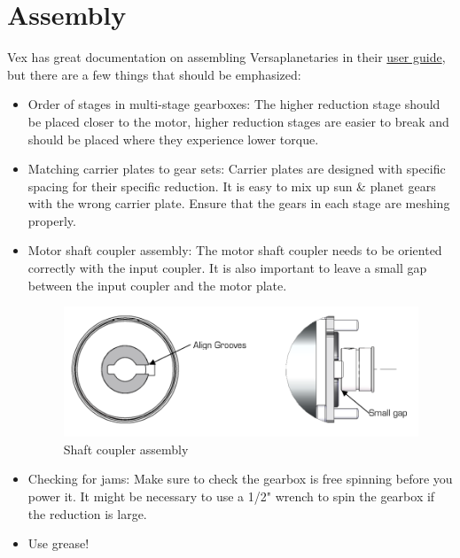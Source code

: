 \documentclass[12pt, letterpaper]{article}
\begin{document}
\section{Assembly}
Vex has great documentation on assembling Versaplanetaries in their \href{https://content.vexrobotics.com/vexpro/pdf/VersaPlanetary-v2-UserGuide-20170403.pdf}{user guide}, but there are a  few things that should be emphasized:
\begin{itemize}
    \item Order of stages in multi-stage gearboxes:
    \newline The higher reduction stage should be placed closer to the motor, higher reduction stages are easier to break and should be placed where they experience lower torque.
    
    \item  Matching carrier plates to gear sets:
    \newline Carrier plates are designed with specific spacing for their specific reduction. It is easy to mix up sun \& planet gears with the wrong carrier plate. Ensure that the gears in each stage are meshing properly.
    
    \item Motor shaft coupler assembly:
    \newline The  motor shaft coupler needs to be oriented correctly with the input coupler. It is also important to leave a small gap between the input coupler and the motor plate.

    \begin{figure}[h!]
        \centering
        \includegraphics[scale = 0.5]{Shaft coupler.png}
        \caption{Shaft coupler assembly}
    \end{figure}
    
    \item Checking for jams:
    \newline Make sure to check the gearbox is free spinning before you power it. It might be necessary to use a 1/2" wrench to spin the gearbox if the reduction is large.
    
    \item Use grease!

\end{itemize}
\end{document}
